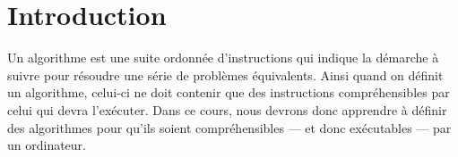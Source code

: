 

\section{Introduction}
Un algorithme est une suite ordonnée d'instructions qui indique la démarche à
suivre pour résoudre une série de problèmes équivalents. Ainsi quand on définit
un algorithme, celui-ci ne doit contenir que des instructions compréhensibles
par celui qui devra l'exécuter. Dans ce cours, nous devrons donc apprendre à
définir des algorithmes pour qu'ils soient compréhensibles --- et donc
exécutables --- par un ordinateur.

